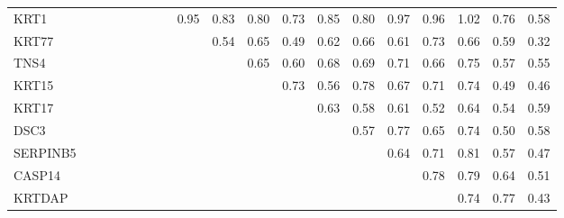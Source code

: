 \begin{longtable}{lrrrrrrrrrrrrrrrrrr}
KRT1     &           &            &              &             &            &            &            &        0.95 &       0.83 &        0.80 &        0.73 &       0.85 &           0.80 &         0.97 &         0.96 &       1.02 &          0.76 &         0.58 \\
KRT77    &           &            &              &             &            &            &            &             &       0.54 &        0.65 &        0.49 &       0.62 &           0.66 &         0.61 &         0.73 &       0.66 &          0.59 &         0.32 \\
TNS4     &           &            &              &             &            &            &            &             &            &        0.65 &        0.60 &       0.68 &           0.69 &         0.71 &         0.66 &       0.75 &          0.57 &         0.55 \\
KRT15    &           &            &              &             &            &            &            &             &            &             &        0.73 &       0.56 &           0.78 &         0.67 &         0.71 &       0.74 &          0.49 &         0.46 \\
KRT17    &           &            &              &             &            &            &            &             &            &             &             &       0.63 &           0.58 &         0.61 &         0.52 &       0.64 &          0.54 &         0.59 \\
DSC3     &           &            &              &             &            &            &            &             &            &             &             &            &           0.57 &         0.77 &         0.65 &       0.74 &          0.50 &         0.58 \\
SERPINB5 &           &            &              &             &            &            &            &             &            &             &             &            &                &         0.64 &         0.71 &       0.81 &          0.57 &         0.47 \\
CASP14   &           &            &              &             &            &            &            &             &            &             &             &            &                &              &         0.78 &       0.79 &          0.64 &         0.51 \\
KRTDAP   &           &            &              &             &            &            &            &             &            &             &             &            &                &              &              &       0.74 &          0.77 &         0.43 \\

\end{longtable}
